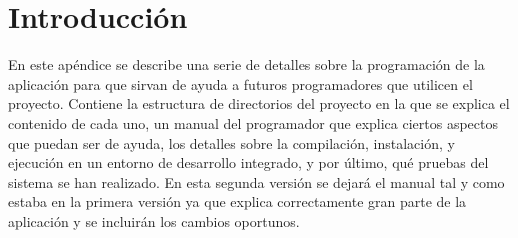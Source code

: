 
\section{Introducción}
En este apéndice se describe una serie de detalles sobre la programación de la aplicación para que sirvan de ayuda a futuros programadores que utilicen el proyecto. Contiene la estructura de directorios del proyecto en la que se explica el contenido de cada uno, un manual del programador que explica ciertos aspectos que puedan ser de ayuda, los detalles sobre la compilación, instalación, y ejecución en un entorno de desarrollo integrado, y por último, qué pruebas del sistema se han realizado.
En esta segunda versión se dejará el manual tal y como estaba en la primera versión ya que explica correctamente gran parte de la aplicación y se incluirán los cambios oportunos.

